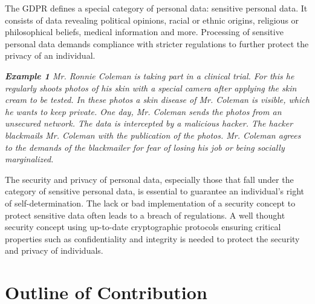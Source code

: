 The GDPR defines a special category of personal data: sensitive personal data\cite{GDPR9}. It consists of data revealing political opinions, racial or ethnic origins, religious or philosophical beliefs, medical information and more. Processing of sensitive personal data demands compliance with stricter regulations to further protect the privacy of an individual.

\textit{\textbf{Example 1} Mr. Ronnie Coleman is taking part in a clinical trial. For this he regularly shoots photos of his skin with a special camera after applying the skin cream to be tested. In these photos a skin disease of Mr. Coleman is visible, which he wants to keep private.
One day, Mr. Coleman sends the photos from an unsecured network. The data is intercepted by a malicious hacker. The hacker blackmails Mr. Coleman with the publication of the photos. Mr. Coleman agrees to the demands of the blackmailer for fear of losing his job or being socially marginalized.}

The security and privacy of personal data, especially those that fall under the category of sensitive personal data, is essential to guarantee an individual’s right of self-determination. The lack or bad implementation of a security concept to protect sensitive data often leads to a breach of regulations. A well thought security concept using up-to-date cryptographic protocols ensuring critical properties such as confidentiality and integrity is needed to protect the security and privacy of individuals.
 
\section{Outline of Contribution}
\label{contribution}

